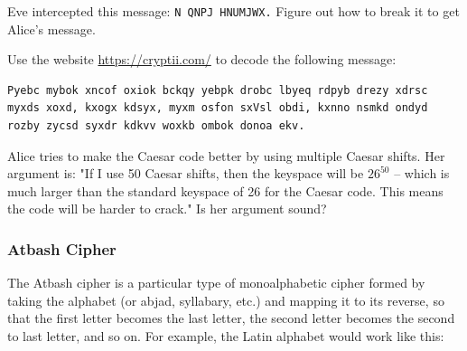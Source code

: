 \documentclass[11pt,a4paper]{report}
\begin{document}
\begin{ex}
Eve intercepted this message: \verb|N QNPJ HNUMJWX.|
Figure out how to break it to get Alice’s message.
\end{ex}


\begin{ex}
Use the website \url{https://cryptii.com/} to decode the following message:
\begin{verbatim}
Pyebc mybok xncof oxiok bckqy yebpk drobc lbyeq rdpyb drezy xdrsc
myxds xoxd, kxogx kdsyx, myxm osfon sxVsl obdi, kxnno nsmkd ondyd
rozby zycsd syxdr kdkvv woxkb ombok donoa ekv.
\end{verbatim}
\end{ex}

\begin{ex}
Alice tries to make the Caesar code better by using multiple Caesar shifts.
Her argument is: "If I use 50 Caesar shifts,  then the keyspace will be $26^{50}$ -- which is much larger than the standard keyspace of 26 for the Caesar code.  This means the code will be harder to crack."
Is her argument sound?
\end{ex}

\subsubsection{Atbash Cipher}

The Atbash cipher is a particular type of monoalphabetic cipher formed by taking the alphabet (or abjad, syllabary, etc.) and mapping it to its reverse, so that the first letter becomes the last letter, the second letter becomes the second to last letter, and so on.
For example, the Latin alphabet would work like this:
\end{document}
